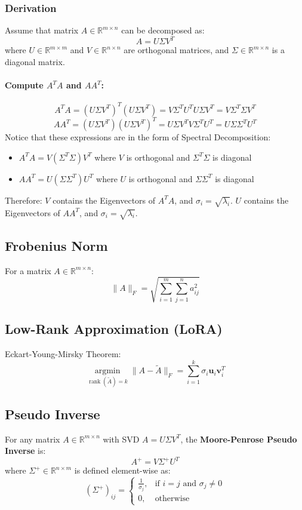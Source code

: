\documentclass{article}
\begin{document}
\subsubsection{Derivation}
Assume that matrix $A \in \mathbb{R}^{m \times n}$ can be decomposed as:
\[
    A = U \Sigma V^T
\]
where $U \in \mathbb{R}^{m \times m}$ and $V \in \mathbb{R}^{n \times n}$ are orthogonal matrices, and $\Sigma \in \mathbb{R}^{m \times n}$ is a diagonal matrix.

\paragraph{Compute $A^T A$ and $AA^T$:}
\[
    A^T A = (U \Sigma V^T)^T (U \Sigma V^T) = V \Sigma^T U^T U \Sigma V^T = V \Sigma^T \Sigma V^T
\]
\[
    AA^T = (U \Sigma V^T)(U \Sigma V^T)^T = U \Sigma V^T V \Sigma^T U^T = U \Sigma \Sigma^T U^T
\]
Notice that these expressions are in the form of Spectral Decomposition:
\begin{itemize}
    \item $A^T A = V (\Sigma^T \Sigma) V^T$ where $V$ is orthogonal and $\Sigma^T \Sigma$ is diagonal
    \item $AA^T = U (\Sigma \Sigma^T) U^T$ where $U$ is orthogonal and $\Sigma \Sigma^T$ is diagonal
\end{itemize}
Therefore: $V$ contains the Eigenvectors of $A^T A$, and $\sigma_i = \sqrt{\lambda_i}$. $U$ contains the Eigenvectors of $AA^T$, and $\sigma_i = \sqrt{\lambda_i}$.

\subsection{Frobenius Norm}
For a matrix $A \in \mathbb{R}^{m \times n}$:
\[
    \|A\|_F = \sqrt{\sum_{i=1}^m \sum_{j=1}^n a_{ij}^2}
\]

\subsection{Low-Rank Approximation (LoRA)}
Eckart-Young-Mirsky Theorem:
\[
    \underset{\operatorname{rank}(\tilde{A})=k}{\operatorname{argmin}} \|A - \tilde{A}\|_F = \sum_{i=1}^{k} \sigma_i \mathbf{u}_i \mathbf{v}_i^T
\]

\subsection{Pseudo Inverse}

For any matrix $A \in \mathbb{R}^{m \times n}$ with SVD $A = U \Sigma V^T$, the \textbf{Moore-Penrose Pseudo Inverse} is:
\[
    A^+ = V \Sigma^+ U^T
\]
where $\Sigma^+ \in \mathbb{R}^{n \times m}$ is defined element-wise as:
\[
    (\Sigma^+)_{ij} =
    \begin{cases}
        \frac{1}{\sigma_j}, & \text{if } i = j \text{ and } \sigma_j \neq 0 \\
        0, & \text{otherwise}
    \end{cases}
\]
\end{document}
